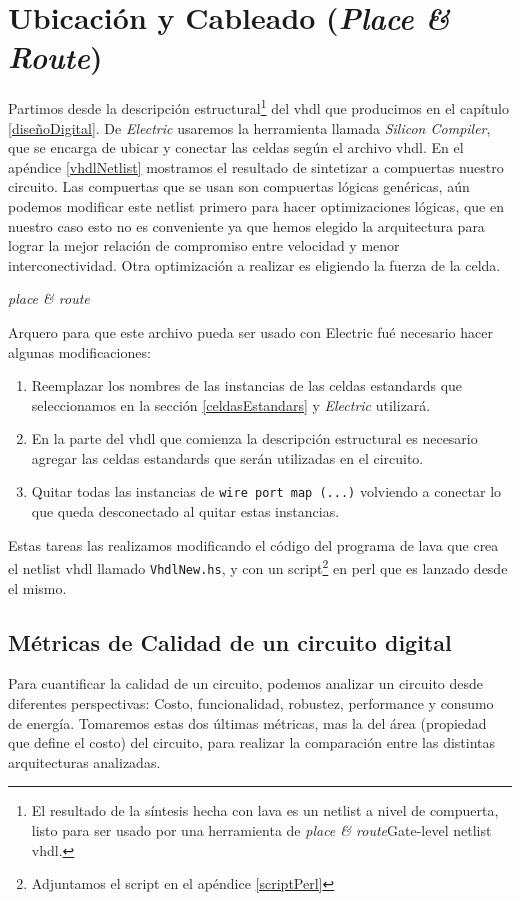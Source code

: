 \section{Ubicación y Cableado (\emph{Place \& Route})}
Partimos desde la descripción estructural\footnote{El resultado de la síntesis hecha con lava es un netlist a nivel de compuerta, listo para ser usado por una herramienta de \emph{place \& route}Gate-level netlist vhdl.} del vhdl que producimos en el capítulo \ref{diseñoDigital}. De \emph{Electric} usaremos la herramienta llamada \emph{Silicon Compiler}, que se encarga de ubicar y conectar las celdas según el archivo vhdl. En el apéndice \ref{vhdlNetlist} mostramos el resultado de sintetizar a compuertas nuestro circuito. Las compuertas que se usan son compuertas lógicas genéricas, aún podemos modificar este netlist primero para hacer optimizaciones lógicas, que en nuestro caso esto no es conveniente ya que hemos elegido la arquitectura para lograr la mejor relación de compromiso entre velocidad y menor interconectividad. Otra optimización a realizar es eligiendo la fuerza de la celda.



\emph{place \& route}



Arquero para que este archivo pueda ser usado con Electric fué necesario hacer algunas modificaciones:
\begin{enumerate}
\item Reemplazar los nombres de las instancias de las celdas estandards que  seleccionamos en la sección \ref{celdasEstandars} y \emph{Electric} utilizará.
\item En la parte del vhdl que comienza la descripción estructural es necesario agregar las celdas estandards que serán utilizadas en el circuito.
\item Quitar todas las instancias de \verb|wire port map (...)| volviendo a conectar lo que queda desconectado al quitar estas instancias.
\end{enumerate}  
Estas tareas las realizamos modificando el código del programa de lava que crea el netlist vhdl llamado \verb|VhdlNew.hs|, y con un script\footnote{Adjuntamos el script en el apéndice \ref{scriptPerl}} en perl que es lanzado desde el mismo.
\subsection{Métricas de Calidad de un circuito digital}

Para cuantificar la calidad de un circuito, podemos analizar un circuito desde diferentes perspectivas: Costo, funcionalidad, robustez, performance y consumo de energía. Tomaremos estas dos últimas métricas, mas la del área (propiedad que define el costo) del circuito, para realizar la comparación entre las distintas arquitecturas analizadas.

